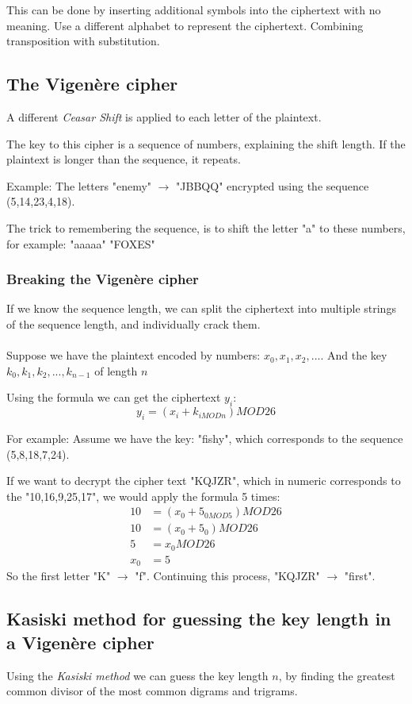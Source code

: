 \documentclass{article}
\begin{document}
	This can be done by inserting additional symbols into the ciphertext with no meaning. Use a different alphabet to represent the ciphertext. Combining transposition with substitution. 
	
	\subsection*{The Vigenère cipher}
	A different \textit{Ceasar Shift} is applied to each letter of the plaintext.
	
	The key to this cipher is a sequence of numbers, explaining the shift length. If the plaintext is longer than the sequence, it repeats. 
	
	Example: The letters "enemy" $\rightarrow$ "JBBQQ" encrypted using the sequence (5,14,23,4,18). 
	
	The trick to remembering the sequence, is to shift the letter "a" to these numbers, for example: "aaaaa"  "FOXES"	
	
	\subsubsection*{Breaking the Vigenère cipher}
	If we know the sequence length, we can split the ciphertext into multiple strings of the sequence length, and individually crack them.  
	\\\\
	Suppose we have the plaintext encoded by numbers: $x_0,x_1,x_2,...$. And the key $k_0,k_1,k_2,...,k_{n-1}$ of length $n$  
	
	Using the formula we can get the ciphertext $y_i$:
	$$
	y_i = (x_i + k_{i MOD n}) MOD 26
	$$
	
	For example:
	Assume we have the key: "fishy", which corresponds to the sequence (5,8,18,7,24). 
	
	If we want to decrypt the cipher text "KQJZR", which in numeric corresponds to the "10,16,9,25,17", we would apply the formula 5 times:
	\[
	\begin{split}
		10 	&= (x_0 + 5_{0 MOD 5}) MOD 26 \\
		10	&= (x_0 + 5_0) MOD 26 \\
		5	&= x_0 MOD 26 \\
		x_0 &= 5
	\end{split}
	\]
	So the first letter "K" $\rightarrow$ "f". Continuing this process, "KQJZR" $\rightarrow$ "first".
	
	\subsection*{Kasiski method for guessing the key length in a Vigenère cipher}
	Using the \textit{Kasiski method} we can guess the key length $n$, by finding the greatest common divisor of the most common digrams and trigrams.
	
\end{document}
